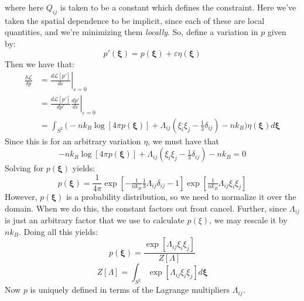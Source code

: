 \documentclass[reqno]{article}
\begin{document}
	where here $Q_{ij}$ is taken to be a constant which defines the constraint.
	Here we've taken the spatial dependence to be implicit, since each of these are local quantities, and we're minimizing them \textit{locally}.
	So, define a variation in $p$ given by:
	\begin{equation}
		p'(\mathbf{\xi}) 
		= p(\mathbf{\xi}) + \varepsilon \eta(\mathbf{\xi})
	\end{equation}
	Then we have that:
	\begin{equation}
	\begin{split}
		\frac{\delta \mathcal{L}}{\delta p}
		&= \left.\frac{d \mathcal{L}[p']}{d \varepsilon} \right|_{\varepsilon = 0} \\
		&= \left.\frac{d \mathcal{L} [p']}{d p'} \frac{d p'}{d \varepsilon} \right|_{\varepsilon = 0} \\
		&= \int_{S^2} \biggl(
		-n k_B\log \left[ 4\pi p(\mathbf{\xi}) \right]
		+ \Lambda_{ij} \left( \xi_i \xi_j - \tfrac13 \delta_{ij} \right)
		- n k_B
		\biggr) \eta(\mathbf{\xi}) d \mathbf{\xi}
	\end{split}
	\end{equation}
	Since this is for an arbitrary variation $\eta$, we must have that
	\begin{equation}
	-n k_B\log \left[ 4\pi p(\mathbf{\xi}) \right]
	+ \Lambda_{ij} \left( \xi_i \xi_j - \tfrac13 \delta_{ij} \right)
	- n k_B
	= 0
	\end{equation}
	Solving for $p(\mathbf{\xi})$ yields:
	\begin{equation}
		p(\mathbf{\xi}) 
		= \frac{1}{4 \pi}
		\exp \left[
		- \tfrac{1}{n k_B} \tfrac13 \Lambda_{ij} \delta_{ij} -  1
		\right]
		\exp\left[
		\tfrac{1}{n k_B} \Lambda_{ij} \xi_i \xi_j
		\right]
	\end{equation}
	However, $p(\mathbf{\xi})$ is a probability distribution, so we need to normalize it over the domain.
	When we do this, the constant factors out front cancel.
	Further, since $\Lambda_{ij}$ is just an arbitrary factor that we use to calculate $p(\xi)$, we may rescale it by $n k_B$.
	Doing all this yields:
	\begin{equation} \label{eq:p-expr}
		p( \mathbf{\xi} )
		= \frac{\exp\left[ \Lambda_{ij} \xi_i \xi_j \right]}{Z\left[\Lambda\right]}
	\end{equation}
	\begin{equation}
		Z\left[\Lambda\right]
		= \int_{S^2} \exp[\Lambda_{ij} \xi_i \xi_j] d\mathbf{\xi}
	\end{equation}
	Now $p$ is uniquely defined in terms of the Lagrange multipliers $\Lambda_{ij}$.
\end{document}
